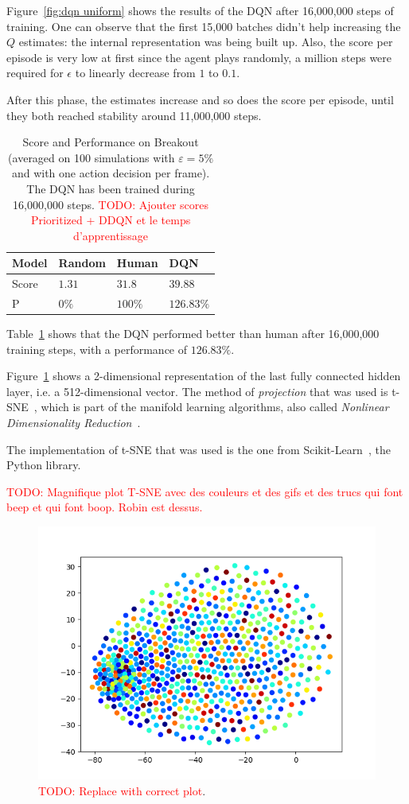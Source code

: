 \documentclass[letterpaper]{article}
\newcommand\todo[1]{\textcolor{red}{TODO: #1}}
\begin{document}
Figure~\ref{fig:dqn uniform} shows the results of the DQN after 16,000,000 steps of training. One can observe that the first 15,000 batches didn't help
increasing the $Q$ estimates: the internal representation was being built up. Also, the score per episode is very low at first since the agent plays
randomly, a million steps were required for $\epsilon$ to linearly decrease from $1$ to $0.1$.

After this phase, the estimates increase and so does the score per episode, until they both reached stability around 11,000,000 steps.

\begin{table}[!h]
	\centering
	\begin{tabular}{l|l|l|l}
		Model & Random & Human & DQN \\ \hline \hline
		Score & $1.31$ & $31.8$ & $39.88$ \\ \hline
		P &  $0\%$ & $100\%$ & $126.83\%$
	\end{tabular}
	\caption{Score and Performance on Breakout (averaged on 100 simulations with $\varepsilon=5\%$ and with one action decision per frame). The DQN has been
	trained during 16,000,000 steps.
	\todo{Ajouter scores Prioritized + DDQN et le temps d'apprentissage}\label{tab:scores breakout}}
\end{table}

Table~\ref{tab:scores breakout} shows that the DQN performed better than human after 16,000,000 training steps, with a performance of $126.83\%$.

Figure~\ref{fig:t-SNE DQN uniform} shows a 2-dimensional representation of the last fully connected hidden layer, i.e. a 512-dimensional
vector. The method of \textit{projection} that was used is t-SNE~\citep{maaten2008visualizing}, which is part of the manifold learning algorithms, also
called \textit{Nonlinear Dimensionality Reduction}~\citep{lee2007nonlinear}.

The implementation of t-SNE that was used is the one from Scikit-Learn~\citep{scikit-learn}, the Python library.

  \todo{Magnifique plot T-SNE avec des couleurs et des gifs et des trucs qui font beep et qui font boop. Robin est dessus.}~\citep{wattenberg2016how}

\begin{figure}
	\includegraphics[width=.5\textwidth]{figures/TSNE_dqn_uniform}
	\caption{\todo{Replace with correct plot}.\label{fig:t-SNE DQN uniform}}
\end{figure}
\end{document}
